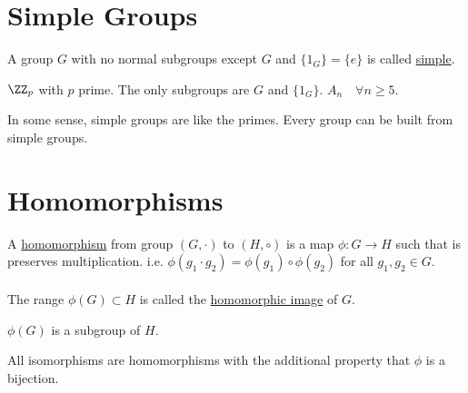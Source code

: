 \documentclass[class=scrartcl, crop=false]{standalone}
\begin{document}
\section{Simple Groups}

\begin{definition}
  A group $G$ with no normal subgroups except $G$ and $\{1_G\} = \{e\}$ is called \ul{simple}.
\end{definition}

\begin{example}
  \begin{enumerate}
    \ii[]
    \ii
    $\ZZ_p$ with $p$ prime. The only subgroups are $G$ and $\{1_G\}$.
    \ii
    $A_n \quad \forall n \geq 5$.
  \end{enumerate}
\end{example}

In some sense, simple groups are like the primes. Every group can be built from simple groups.

\section{Homomorphisms}

\begin{definition}
  A \ul{homomorphism} from group $(G, \cdot)$ to $(H, \circ)$ is a map $\phi:G \to H$ such that is preserves multiplication. i.e. $\phi(g_1 \cdot g_2) = \phi(g_1)\circ\phi(g_2)$ for all $g_1, g_2 \in G$.
  \\\\
  The range $\phi(G) \subset H$ is called the \ul{homomorphic image} of $G$.
  \begin{remark}
    $\phi(G)$ is a subgroup of $H$.
  \end{remark}
  \begin{note}
    All isomorphisms are homomorphisms with the additional property that $\phi$ is a bijection.
  \end{note}
\end{definition}
\end{document}
